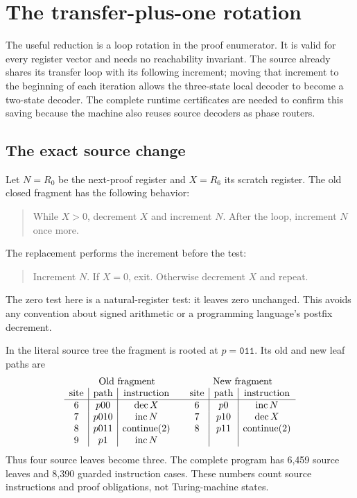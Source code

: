 \section{The transfer-plus-one rotation}
\label{sec:qt-rotation}

The useful reduction is a loop rotation in the proof enumerator.  It is
valid for every register vector and needs no reachability invariant.
The source already shares its transfer loop with its following increment;
moving that increment to the beginning of each iteration allows the
three-state local decoder to become a two-state decoder.  The complete
runtime certificates are needed to confirm this saving because the
machine also reuses source decoders as phase routers.

\subsection{The exact source change}

Let $N=R_0$ be the next-proof register and $X=R_6$ its scratch register.
The old closed fragment has the following behavior:
\begin{quote}
While $X>0$, decrement $X$ and increment $N$.  After the loop,
increment $N$ once more.
\end{quote}
The replacement performs the increment before the test:
\begin{quote}
Increment $N$.  If $X=0$, exit.  Otherwise decrement $X$ and repeat.
\end{quote}
The zero test here is a natural-register test: it leaves zero unchanged.
This avoids any convention about signed arithmetic or a programming
language's postfix decrement.

In the literal source tree the fragment is rooted at
$p=\texttt{011}$.  Its old and new leaf paths are
\[
\begin{array}{c|c|c@{\qquad}c|c|c}
\multicolumn{3}{c}{\text{Old fragment}}&
\multicolumn{3}{c}{\text{New fragment}}\\
\text{site}&\text{path}&\text{instruction}&
\text{site}&\text{path}&\text{instruction}\\\hline
6&p00&\operatorname{dec}X&6&p0&\operatorname{inc}N\\
7&p010&\operatorname{inc}N&7&p10&\operatorname{dec}X\\
8&p011&\operatorname{continue}(2)&8&p11&\operatorname{continue}(2)\\
9&p1&\operatorname{inc}N&&&
\end{array}
\]
Thus four source leaves become three.  The complete program has 6,459
source leaves and 8,390 guarded instruction cases.  These numbers count
source instructions and proof obligations, not Turing-machine states.

